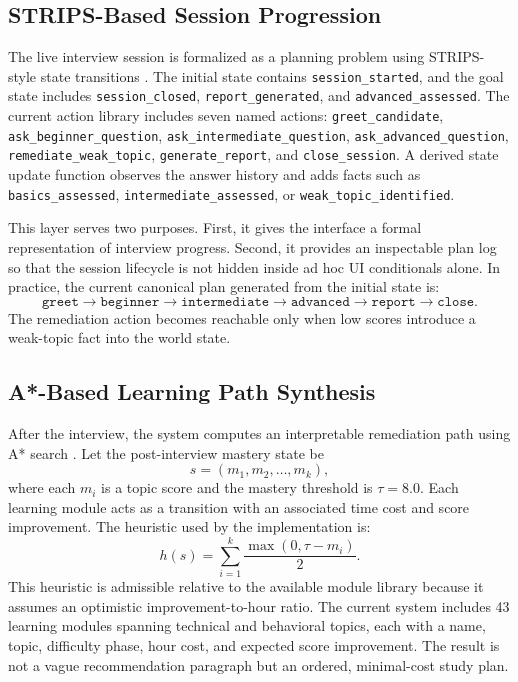 \documentclass[conference]{IEEEtran}
\begin{document}
\subsection{STRIPS-Based Session Progression}
The live interview session is formalized as a planning problem using STRIPS-style state transitions \cite{r10,r11}. The initial state contains \texttt{session\_started}, and the goal state includes \texttt{session\_closed}, \texttt{report\_generated}, and \texttt{advanced\_assessed}. The current action library includes seven named actions: \texttt{greet\_candidate}, \texttt{ask\_beginner\_question}, \texttt{ask\_intermediate\_question}, \texttt{ask\_advanced\_question}, \texttt{remediate\_weak\_topic}, \texttt{generate\_report}, and \texttt{close\_session}. A derived state update function observes the answer history and adds facts such as \texttt{basics\_assessed}, \texttt{intermediate\_assessed}, or \texttt{weak\_topic\_identified}.

This layer serves two purposes. First, it gives the interface a formal representation of interview progress. Second, it provides an inspectable plan log so that the session lifecycle is not hidden inside ad hoc UI conditionals alone. In practice, the current canonical plan generated from the initial state is:
\begin{equation}
\texttt{greet} \rightarrow \texttt{beginner} \rightarrow \texttt{intermediate} \rightarrow \texttt{advanced} \rightarrow \texttt{report} \rightarrow \texttt{close}.
\end{equation}
The remediation action becomes reachable only when low scores introduce a weak-topic fact into the world state.

\subsection{A*-Based Learning Path Synthesis}
After the interview, the system computes an interpretable remediation path using A* search \cite{r9,r11}. Let the post-interview mastery state be
\begin{equation}
s = (m_1, m_2, \dots, m_k),
\end{equation}
where each $m_i$ is a topic score and the mastery threshold is $\tau = 8.0$. Each learning module acts as a transition with an associated time cost and score improvement. The heuristic used by the implementation is:
\begin{equation}
h(s) = \sum_{i=1}^{k}\frac{\max(0,\tau - m_i)}{2}.
\label{eq:astar}
\end{equation}
This heuristic is admissible relative to the available module library because it assumes an optimistic improvement-to-hour ratio. The current system includes 43 learning modules spanning technical and behavioral topics, each with a name, topic, difficulty phase, hour cost, and expected score improvement. The result is not a vague recommendation paragraph but an ordered, minimal-cost study plan.
\end{document}
